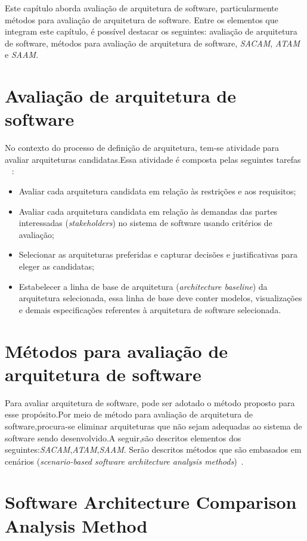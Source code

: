 Este capítulo aborda avaliação de arquitetura de software, particularmente métodos para avaliação de arquitetura de software. Entre os elementos que integram este capítulo, é possível destacar os seguintes: avaliação de arquitetura de software, métodos para avaliação de arquitetura de software, \emph{\acrfull{SACAM}}, \emph{\acrfull{ATAM}} e \emph{\acrfull{SAAM}}.

\section{Avaliação de arquitetura de software}

No contexto do processo de definição de arquitetura, tem-se atividade para avaliar arquiteturas candidatas.Essa atividade é composta pelas seguintes tarefas ~\cite{ISO_12207} :
\begin{itemize}
    \item Avaliar cada arquitetura candidata em relação às restrições e aos requisitos;
    \item Avaliar cada arquitetura candidata em relação às demandas das partes interessadas (\emph{stakeholders}) no sistema de software usando critérios de avaliação;
    \item Selecionar as arquiteturas preferidas e capturar decisões e justificativas para eleger as candidatas;
    \item Estabelecer a linha de base de arquitetura (\emph{architecture baseline}) da arquitetura selecionada, essa linha de base deve conter modelos, visualizações e demais especificações referentes à arquitetura de software selecionada.
\end{itemize}

\section{Métodos para avaliação de arquitetura de software}

Para avaliar arquitetura de software, pode ser adotado o método proposto para esse propósito.Por meio de método para avaliação de arquitetura de software,procura-se eliminar arquiteturas que não sejam adequadas ao sistema de software sendo desenvolvido.A seguir,são descritos elementos dos seguintes:\emph{\acrfull{SACAM}},\emph{\acrfull{ATAM}},\emph{\acrfull{SAAM}}. 
Serão descritos métodos que são embasados em cenários (\emph{scenario-based software architecture analysis methods})~\cite{survey_methods}. 
  
\section{Software Architecture Comparison Analysis Method}

